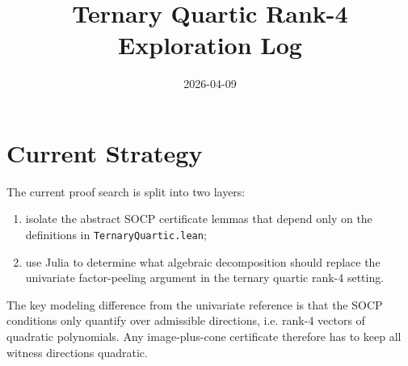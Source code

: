 \documentclass[11pt]{article}
\title{Ternary Quartic Rank-4 Exploration Log}
\date{2026-04-09}
\begin{document}
\maketitle

\section*{Current Strategy}
The current proof search is split into two layers:
\begin{enumerate}
\item isolate the abstract SOCP certificate lemmas that depend only on the
definitions in \texttt{TernaryQuartic.lean};
\item use Julia to determine what algebraic decomposition should replace the
univariate factor-peeling argument in the ternary quartic rank-4 setting.
\end{enumerate}

The key modeling difference from the univariate reference is that the SOCP
conditions only quantify over admissible directions, i.e. rank-4 vectors of
quadratic polynomials. Any image-plus-cone certificate therefore has to keep all
witness directions quadratic.
\end{document}
